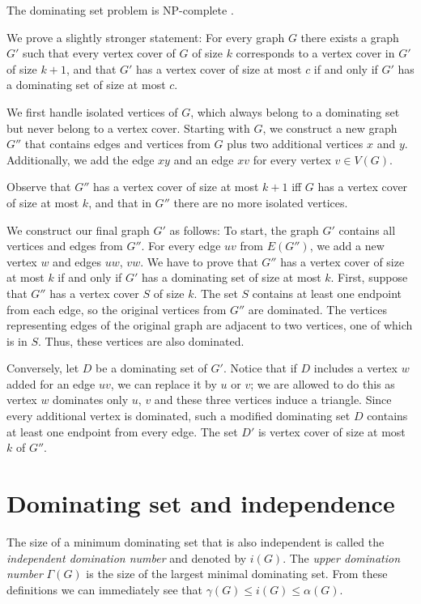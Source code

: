 \begin{thm}
	The dominating set problem is NP-complete \cite{GareyJohnson79}.
\end{thm}
\begin{myproof}
We prove a slightly stronger statement: For every graph \(G\) there
exists a graph \(G'\) such that every vertex cover of \(G\) of size $k$ corresponds
to a vertex cover in \(G'\) of size \(k+1\), and that \(G'\) has a vertex cover of size at most $c$
if and only if \(G'\) has a dominating set of size at most $c$.

We first handle isolated vertices of \(G\), which always belong to a dominating set but never belong
to a vertex cover. Starting with \(G\), we construct a new graph \(G''\) that contains edges and vertices from \(G\) plus two additional vertices
\(x\) and \(y\). Additionally, we add the edge \(xy\) and an edge \(xv\) for every vertex \(v \in V(G)\).

Observe that \(G''\) has a vertex cover of size at most \(k + 1\) iff
\(G\) has a vertex cover of size at most \(k\), and that in \(G''\)
there are no more isolated vertices.

We construct our final graph \(G'\) as follows: To start, the graph \(G'\)
contains all vertices and edges from \(G''\).  For every edge \(uv\)
from \(E(G'')\), we add a new vertex \(w\) and edges \(uw\), \(vw\).  We
have to prove that \(G''\) has a vertex cover of size at most \(k\) if
and only if \(G'\) has a dominating set of size at most \(k\).  First,
suppose that \(G''\) has a vertex cover \(S\) of size \(k\).  The set
\(S\) contains at least one endpoint from each edge, so the original
vertices from \(G''\) are dominated.  The vertices representing edges of
the original graph are adjacent to two vertices, one of which is in
\(S\).  Thus, these vertices are also dominated.

Conversely, let \(D\) be a dominating set of \(G'\).  Notice that if
\(D\) includes a vertex \(w\) added for an edge \(uv\), we can replace
it by \(u\) or \(v\); we are allowed to do this as vertex \(w\)
dominates only \(u\), \(v\) and these three vertices induce a
triangle.  Since every additional vertex is dominated, such a modified
dominating set \(D\) contains at least one endpoint from every edge.
The set \(D'\) is vertex cover of size at most \(k\) of \(G''\).
\end{myproof}

\section{Dominating set and independence}
The size of a minimum dominating set that is also independent is called the \emph{independent domination number} and denoted by \(i(G)\).
The \emph{upper domination number} \(\Gamma(G)\) is the size of the largest minimal dominating set.
From these definitions we can immediately see that \(\gamma(G) \leq i(G) \leq \alpha(G)\).

